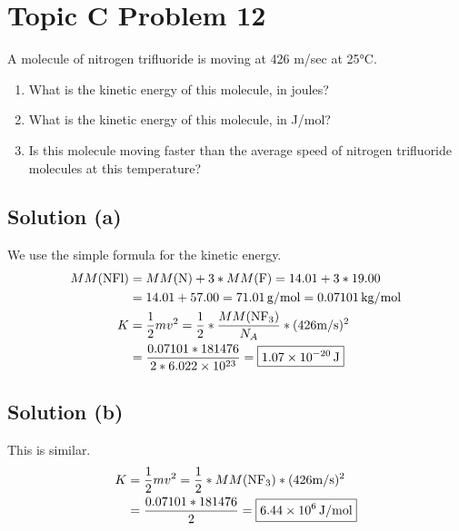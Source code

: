 \documentclass[10pt]{article}
\newcommand{\E}[1]{\times 10^{#1}}
\begin{document}
    \pagebreak
    \section{Topic C Problem 12}
        A molecule of nitrogen trifluoride is moving at 426 m/sec at 25\unit{\celsius}.
        \begin{enumerate} [label=\alph*)]
            \item What is the kinetic energy of this molecule, in joules?
            \item What is the kinetic energy of this molecule, in J/mol?
            \item Is this molecule moving faster than the average speed of nitrogen trifluoride molecules at this temperature?
        \end{enumerate}

        \subsection{Solution (a)}
            We use the simple formula for the kinetic energy. 
            \begin{align}
                MM(\ce{NFl})   &=  MM(\ce{N}) + 3 * MM(\ce{F})
                    =   14.01 + 3 * 19.00\\
                    &=  14.01 + 57.00
                    =   71.01\,\unit{\gram/\mole}
                    =   0.07101\,\unit{\kilo\gram/\mole}\\
                K   &=  \frac{1}{2}mv^2
                    =   \frac{1}{2} * \frac{MM(\ce{NF3})}{N_A} * (426\unit{\meter/\second})^2\\
                    &=  \frac{0.07101 * 181476}{2 * 6.022\E{23}}
                    =   \boxed{1.07\E{-20}\,\unit{\joule}}
            \end{align}

        \subsection{Solution (b)}
            This is similar.
            \begin{align}
                K   &=  \frac{1}{2}mv^2
                    =   \frac{1}{2} * MM(\ce{NF3}) * (426\unit{\meter/\second})^2\\
                    &=  \frac{0.07101 * 181476}{2}
                    =   \boxed{6.44\E{6}\,\unit{\joule/\mole}}
            \end{align}
\end{document}

